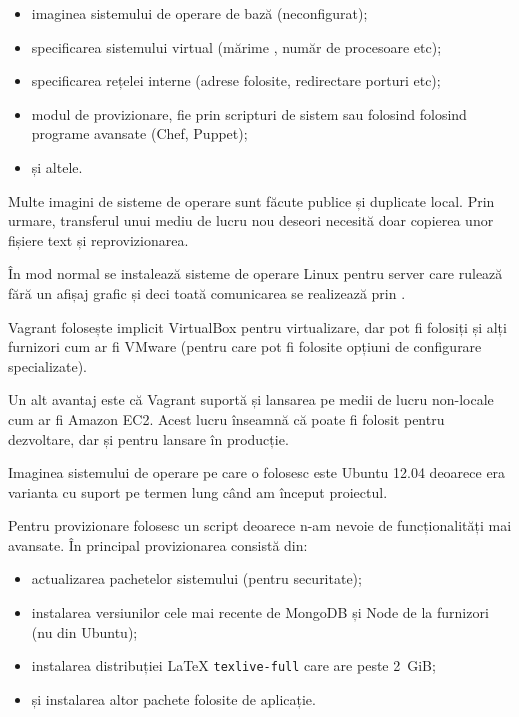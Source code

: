 \documentclass[a4wide,12pt]{report}
\newcommand{\cod}[1]{\texttt{#1}}
\newcommand{\acr}[1]{{\textsmaller[1]{\textsc{#1}}}} %
\begin{document}
\begin{itemize}

\item imaginea sistemului de operare de bază (neconfigurat);

\item specificarea sistemului virtual (mărime \acr{RAM}, număr de procesoare
etc);

\item specificarea rețelei interne (adrese \acr{IP} folosite, redirectare
porturi etc);

\item modul de provizionare, fie prin scripturi de sistem sau folosind folosind
programe avansate (Chef, Puppet);

\item și altele.

\end{itemize}

Multe imagini de sisteme de operare sunt făcute publice și duplicate local. Prin
urmare, transferul unui mediu de lucru nou deseori necesită doar copierea unor
fișiere text și reprovizionarea.

În mod normal se instalează sisteme de operare Linux pentru server care rulează
fără un afișaj grafic și deci toată comunicarea se realizează prin \acr{SSH}.

Vagrant folosește implicit VirtualBox pentru virtualizare, dar pot fi folosiți
și alți furnizori cum ar fi VMware (pentru care pot fi folosite opțiuni de
configurare specializate).

Un alt avantaj este că Vagrant suportă și lansarea pe medii de lucru non-locale
cum ar fi Amazon EC2. Acest lucru înseamnă că poate fi folosit pentru
dezvoltare, dar și pentru lansare în producție.

Imaginea sistemului de operare pe care o folosesc este Ubuntu 12.04 deoarece era
varianta cu suport pe termen lung când am început proiectul.

Pentru provizionare folosesc un script deoarece n-am nevoie de funcționalități
mai avansate. În principal provizionarea consistă din:

\begin{itemize}

\item actualizarea pachetelor sistemului (pentru securitate);

\item instalarea versiunilor cele mai recente de MongoDB și Node de la furnizori
(nu din Ubuntu);

\item instalarea distribuției \LaTeX{} \cod{texlive-full} care are peste 2~GiB;

\item și instalarea altor pachete folosite de aplicație.

\end{itemize}
\end{document}
